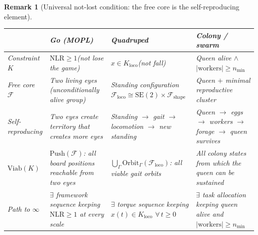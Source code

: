 \documentclass[11pt,a4paper]{article}
\newtheorem{remark}[theorem]{Remark}
\newcommand{\cF}{\mathcal{F}}
\begin{document}
\begin{remark}[Universal not-lost condition:
  the free core is the self-reproducing element]
\medskip
\begin{center}
\small
\begin{tabular}{@{}lp{3.2cm}p{3.8cm}p{3.8cm}@{}}
\toprule
& \textbf{Go (MOPL)}
& \textbf{Quadruped}
& \textbf{Colony / swarm} \\
\midrule
Constraint $K$
  & $\mathrm{NLR} \geq 1$\newline (not lose the game)
  & $x \in K_{\mathrm{loco}}$\newline (not fall)
  & Queen alive $\wedge$\newline
    $|\text{workers}| \geq n_{\min}$ \\[6pt]
Free core $\cF$
  & Two living eyes\newline
    (unconditionally alive group)
  & Standing configuration\newline
    $\cF_{\mathrm{loco}}
     \cong \mathrm{SE}(2) \times
     \cF_{\mathrm{shape}}$
  & Queen $+$ minimal\newline
    reproductive cluster \\[6pt]
Self-reproducing
  & Two eyes create\newline
    territory that creates\newline
    more eyes
  & Standing $\to$ gait $\to$\newline
    locomotion $\to$\newline
    new standing
  & Queen $\to$ eggs $\to$\newline
    workers $\to$ forage\newline
    $\to$ queen survives \\[6pt]
$\mathrm{Viab}(K)$
  & $\mathrm{Push}(\cF)$:\newline
    all board positions\newline
    reachable from two eyes
  & $\bigcup_\Gamma
    \mathrm{Orbit}_\Gamma(\cF_{\mathrm{loco}})$:\newline
    all viable gait orbits
  & All colony states from\newline
    which the queen can\newline
    be sustained \\[6pt]
Path to $\infty$
  & $\exists$ framework sequence\newline
    keeping $\mathrm{NLR} \geq 1$\newline
    at every scale
  & $\exists$ torque sequence\newline
    keeping $x(t) \in K_{\mathrm{loco}}$\newline
    $\forall\, t \geq 0$
  & $\exists$ task allocation\newline
    keeping queen alive\newline
    and $|\text{workers}| \geq n_{\min}$ \\
\bottomrule
\end{tabular}
\end{center}


\end{remark}
\end{document}
